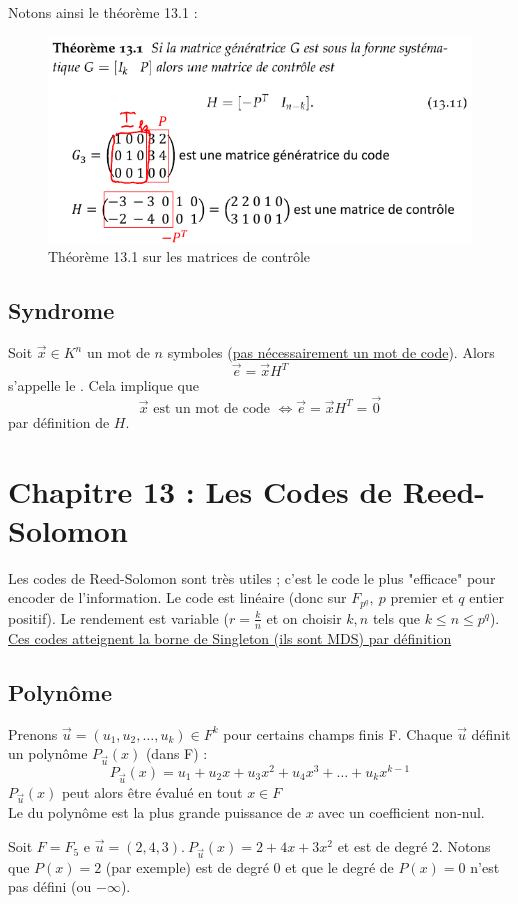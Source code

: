 \documentclass[11pt,a4paper]{article}
\renewcommand{\)}{\right)}
\renewcommand{\(}{\left(}
\begin{document}
	Notons ainsi le théorème 13.1 :
	\begin{figure}[!h]
		\centering
		\includegraphics[scale=0.8]{images/theo13_1}
		\caption{Théorème 13.1 sur les matrices de contrôle}
	\end{figure}

\subsection{Syndrome}
\label{syndrome}
Soit $\vec{x} \in K^n$ un mot de $n$ symboles (\uline{pas nécessairement un mot de code}). Alors 
\[\vec{e}=\vec{x}H^T\]
s'appelle le . Cela implique que
\[\vec{x} \text{ est un mot de code } \iff \vec{e} = \vec{x}H^T = \vec{0}\]
par définition de $H$.

\section[Codes de Reed-Solomon]{Chapitre 13 : Les Codes de Reed-Solomon}
Les codes de Reed-Solomon sont très utiles ; c'est le code le plus "efficace" pour encoder de l'information. Le code est linéaire (donc sur $F_{p^q},\ p$ premier et $q$ entier positif). Le rendement est variable ($r = \frac{k}{n}$ et on choisir $k,n$ tels que $k \leq n \leq p^q$). \uline{Ces codes atteignent \hyperref[Singleton]{la borne de Singleton} (ils sont MDS) par définition}
\subsection{Polynôme}
Prenons $\vec{u} = (u_1,u_2,\ldots,u_k) \in F^k$ pour certains champs finis F. Chaque $\vec{u}$ définit un polynôme $P_{\vec{u}}(x)$ (dans F) :
\begin{equation}
	P_{\vec{u}}(x) = u_1 + u_2x + u_3x^2 + u_4x^3 + \ldots + u_kx^{k-1}
	\label{P(u)}
\end{equation}
$P_{\vec{u}}(x)$ peut alors être évalué en tout $x \in F$\\
Le  du polynôme est la plus grande puissance de $x$ avec un coefficient non-nul.
\begin{exemple}
	Soit $F = F_5$ e $\vec{u} = (2,4,3).\ P_{\vec{u}}(x) = 2 + 4x + 3x^2$ et est de degré 2. Notons que $P(x) = 2$ (par exemple) est de degré 0 et que le degré de $P(x) = 0$ n'est pas défini (ou $-\infty$).
\end{exemple}
\end{document}
